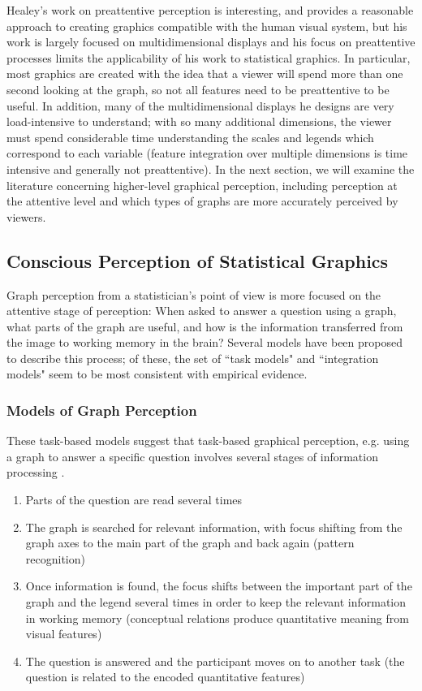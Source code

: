 \documentclass[11pt]{isuthesis}\usepackage[]{graphicx}\usepackage[]{color}
\begin{document}
Healey's work on preattentive perception is interesting, and provides a reasonable approach to creating graphics compatible with the human visual system, but his work is largely focused on multidimensional displays and his focus on preattentive processes limits the applicability of his work to statistical graphics. In particular, most graphics are created with the idea that a viewer will spend more than one second looking at the graph, so not all features need to be preattentive to be useful. In addition, many of the multidimensional displays he designs are very load-intensive to understand; with so many additional dimensions, the viewer must spend considerable time understanding the scales and legends which correspond to each variable (feature integration over multiple dimensions is time intensive and generally not preattentive). In the next section, we will examine the literature concerning higher-level graphical perception, including perception at the attentive level and which types of graphs are more accurately perceived by viewers. 


\subsection{Conscious Perception of Statistical Graphics}\label{HighLevelGraphics}
Graph perception from a statistician's point of view is more focused on the attentive stage of perception: When asked to answer a question using a graph, what parts of the graph are useful, and how is the information transferred from the image to working memory in the brain? Several models have been proposed to describe this process; of these, the set of ``task models" and ``integration models" seem to be most consistent with empirical evidence. 

\subsubsection{Models of Graph Perception}
These task-based models suggest that task-based graphical perception, e.g. using a graph to answer a specific question involves several stages of information processing \citep{ratwani2008thinking}. 
\begin{enumerate}
\item Parts of the question are read several times
\item The graph is searched for relevant information, with focus shifting from the graph axes to the main part of the graph and back again (pattern recognition)
\item Once information is found, the focus shifts between the important part of the graph and the legend several times in order to keep the relevant information in working memory (conceptual relations produce quantitative meaning from visual features)
\item The question is answered and the participant moves on to another task (the question is related to the encoded quantitative features)
\end{enumerate}
\end{document}
